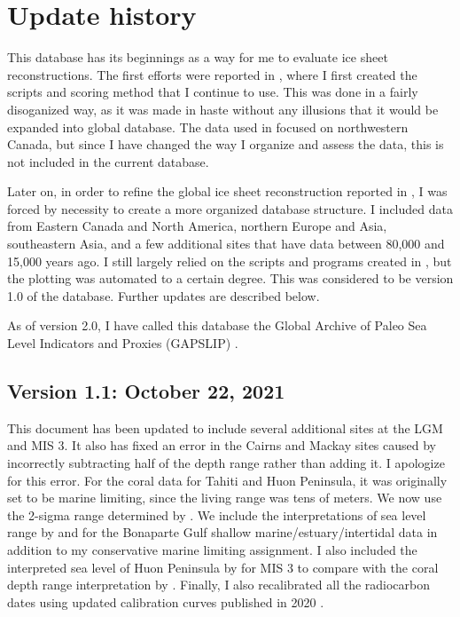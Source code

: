 \section{Update history}

This database has its beginnings as a way for me to evaluate ice sheet reconstructions. The first efforts were reported in \citet{GowanEtal2016}, where I first created the scripts and scoring method that I continue to use. This was done in a fairly disoganized way, as it was made in haste without any illusions that it would be expanded into global database. The data used in \citet{GowanEtal2016} focused on northwestern Canada, but since I have changed the way I organize and assess the data, this is not included in the current database.

Later on, in order to refine the global ice sheet reconstruction reported in \citet{GowanEtal2021b}, I was forced by necessity to create a more organized database structure. I included data from Eastern Canada and North America, northern Europe and Asia, southeastern Asia, and a few additional sites that have data between 80,000 and 15,000 years ago. I still largely relied on the scripts and programs created in \citet{GowanEtal2016}, but the plotting was automated to a certain degree. This was considered to be version 1.0 of the database. Further updates are described below.

As of version 2.0, I have called this database the Global Archive of Paleo Sea Level Indicators and Proxies (GAPSLIP) \citep{Gowan2023}.

\subsection{Version 1.1: October 22, 2021}

This document has been updated to include several additional sites at the LGM and MIS 3. It also has fixed an error in the Cairns and Mackay sites caused by incorrectly subtracting half of the depth range rather than adding it. I apologize for this error. For the coral data for Tahiti and Huon Peninsula, it was originally set to be marine limiting, since the living range was tens of meters. We now use the 2-sigma range determined by \citet{HibbertEtal2016}. We include the interpretations of sea level range by \citet{IshiwaEtal2019} and \citet{YokoyamaEtal2000} for the Bonaparte Gulf shallow marine/estuary/intertidal data in addition to my conservative marine limiting assignment. I also included the interpreted sea level of Huon Peninsula by \citet{deGelderEtal2022} for MIS 3 to compare with the coral depth range interpretation by \citet{HibbertEtal2016}. Finally, I also recalibrated all the radiocarbon dates using updated calibration curves published in 2020 \citep{HeatonEtal2020,HoggEtal2020,ReimerEtal2020}.


